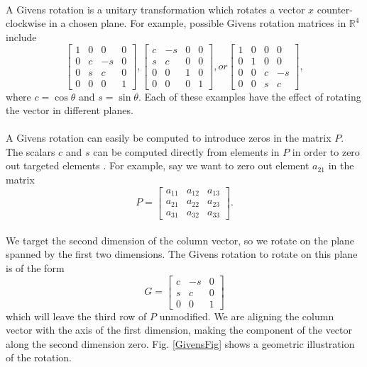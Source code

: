 \documentclass{article}
\begin{document}
\paragraph{}
A Givens rotation is a unitary transformation which rotates a vector $x$ counter-clockwise in a chosen plane. For example, possible Givens rotation matrices in $\mathbb{R}^4$ include
\begin{equation}
\begin{bmatrix}
1 & 0 & 0 & 0\\
0 & c & -s & 0\\
0 & s & c & 0\\
0 & 0 & 0 & 1
\end{bmatrix},
\begin{bmatrix}
c & -s & 0 & 0\\
s & c & 0 & 0\\
0 & 0 & 1 & 0\\
0 & 0 & 0 & 1
\end{bmatrix}, or
\begin{bmatrix}
1 & 0 & 0 & 0\\
0 & 1 & 0 & 0\\
0 & 0 & c & -s\\
0 & 0 & s & c
\end{bmatrix},
\end{equation}
where $c = \cos{\theta}$ and $s = \sin{\theta}$. Each of these examples have the effect of rotating the vector in different planes.

\paragraph{}
A Givens rotation can easily be computed to introduce zeros in the matrix $P$. The scalars $c$ and $s$ 
can be computed directly from elements in $P$ in order to zero out targeted elements\cite{golub} \cite{bhaskar86givens}. For 
example, say we want to zero out element $a_{21}$ in the matrix
\begin{equation}
P = 
\begin{bmatrix}
a_{11} & a_{12} & a_{13}\\
a_{21} & a_{22} & a_{23}\\
a_{31} & a_{32} & a_{33}
\end{bmatrix}.
\end{equation}
\paragraph{}
We target the second dimension of the column vector, so we rotate on the plane spanned by 
the first two dimensions. The Givens rotation to rotate 
on this plane is of the form
\begin{equation}
G = 
\begin{bmatrix}
c & -s & 0\\
s & c & 0\\
0 & 0 & 1
\end{bmatrix}
\end{equation}
which will leave the third row of $P$ unmodified. We are aligning the column vector with the axis of the first 
dimension, making the component of the vector along the second dimension zero. Fig. \ref{GivensFig} shows a geometric 
illustration of the rotation.
\end{document}
